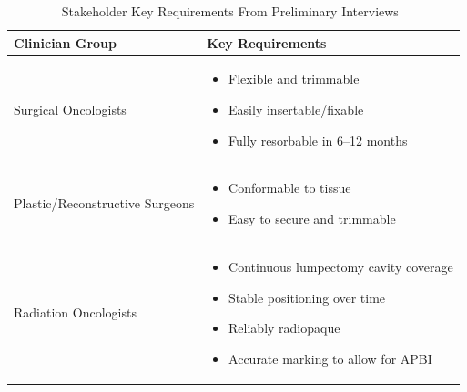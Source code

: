 \begin{table}[h!]
        \centering
        \caption{Stakeholder Key Requirements From Preliminary Interviews~\cite{RefWorks:RefID:172-2024reexcision}}
        \label{tab:introduction:priorWork:preliminaryStakeholderInterviewResults}
        \begin{tabular}{p{4cm} p{10cm}}
                \hline
                \textbf{Clinician Group}        & \textbf{Key Requirements}       \\
                \hline
                Surgical Oncologists            &
                \vspace{-\baselineskip}\begin{itemize}[leftmargin=*]
                                               \item Flexible and trimmable
                                               \item Easily insertable/fixable
                                               \item Fully resorbable in 6--12 months
                                       \end{itemize}      \\

                Plastic/Reconstructive Surgeons &
                \vspace{-\baselineskip}\begin{itemize}[leftmargin=*]
                                               \item Conformable to tissue
                                               \item Easy to secure and trimmable
                                       \end{itemize}          \\

                Radiation Oncologists           &
                \vspace{-\baselineskip}\begin{itemize}[leftmargin=*]
                                               \item Continuous lumpectomy cavity coverage
                                               \item Stable positioning over time
                                               \item Reliably radiopaque
                                               \item Accurate marking to allow for APBI
                                       \end{itemize} \\
                \hline
        \end{tabular}
\end{table}

